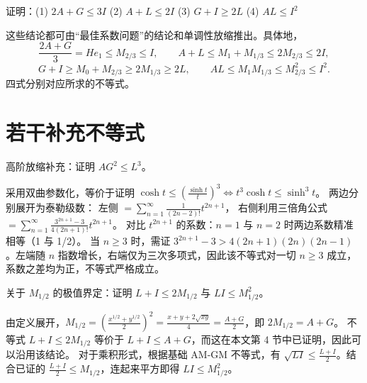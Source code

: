 \begin{example}
证明：(1) $2A+G \le 3I$ \quad (2) $A+L \le 2I$ \quad (3) $G+I \ge 2L$ \quad (4) $AL \le I^2$
\end{example}
\begin{solution}
这些结论都可由“最佳系数问题”的结论和单调性放缩推出。具体地，
\[
\frac{2A+G}{3} = He_1 \le M_{2/3} \le I,\qquad
A+L \le M_1 + M_{1/3} \le 2M_{2/3} \le 2I,
\]
\[
G+I \ge M_0 + M_{2/3} \ge 2M_{1/3} \ge 2L,\qquad
AL \le M_1 M_{1/3} \le M_{2/3}^2 \le I^2.
\]
四式分别对应所求的不等式。
\end{solution}

\section{若干补充不等式}

\begin{example}
高阶放缩补充：证明 $AG^2 \le L^3$。
\end{example}
\begin{solution}
采用双曲参数化，等价于证明 $\cosh t \le \left(\frac{\sinh t}{t}\right)^3 \iff t^3 \cosh t \le \sinh^3 t$。
两边分别展开为泰勒级数：
左侧 $= \sum_{n=1}^{\infty} \frac{1}{(2n-2)!} t^{2n+1}$，
右侧利用三倍角公式 $= \sum_{n=1}^{\infty} \frac{3^{2n+1}-3}{4(2n+1)!} t^{2n+1}$。
对比 $t^{2n+1}$ 的系数：$n=1$ 与 $n=2$ 时两边系数精准相等（1 与 1/2）。
当 $n \ge 3$ 时，需证 $3^{2n+1}-3 > 4(2n+1)(2n)(2n-1)$。左端随 $n$ 指数增长，右端仅为三次多项式，因此该不等式对一切 $n \ge 3$ 成立，系数之差均为正，不等式严格成立。
\end{solution}

\begin{example}
关于 $M_{1/2}$ 的极值界定：证明 $L+I \le 2M_{1/2}$ 与 $LI \le M_{1/2}^2$。
\end{example}
\begin{solution}
由定义展开，$M_{1/2} = \left(\frac{x^{1/2}+y^{1/2}}{2}\right)^2 = \frac{x+y+2\sqrt{xy}}{4} = \frac{A+G}{2}$，即 $2M_{1/2} = A+G$。
不等式 $L+I \le 2M_{1/2}$ 等价于 $L+I \le A+G$，而这在本文第 4 节中已证明，因此可以沿用该结论。
对于乘积形式，根据基础 AM-GM 不等式，有 $\sqrt{LI} \le \frac{L+I}{2}$。结合已证的 $\frac{L+I}{2} \le M_{1/2}$，连起来平方即得 $LI \le M_{1/2}^2$。
\end{solution}

